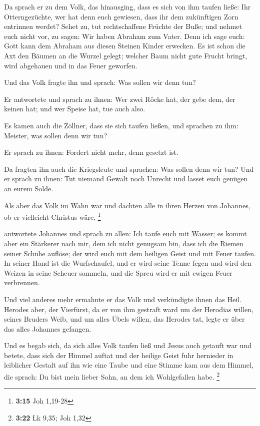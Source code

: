  Da sprach er zu dem Volk, das hinausging, dass es sich von
ihm taufen ließe: Ihr Otterngezüchte, wer hat denn euch gewiesen, dass
ihr dem zukünftigen Zorn entrinnen werdet?  Sehet zu, tut
rechtschaffene Früchte der Buße; und nehmet euch nicht vor, zu sagen:
Wir haben Abraham zum Vater. Denn ich sage euch: Gott kann dem Abraham
aus diesen Steinen Kinder erwecken.  Es ist schon die Axt
den Bäumen an die Wurzel gelegt; welcher Baum nicht gute Frucht bringt,
wird abgehauen und in das Feuer geworfen.

 Und das Volk fragte ihn und sprach: Was sollen wir denn
tun?

 Er antwortete und sprach zu ihnen: Wer zwei Röcke hat, der
gebe dem, der keinen hat; und wer Speise hat, tue auch also.

 Es kamen auch die Zöllner, dass sie sich taufen ließen,
und sprachen zu ihm: Meister, was sollen denn wir tun?

 Er sprach zu ihnen: Fordert nicht mehr, denn gesetzt ist.

 Da fragten ihn auch die Kriegsleute und sprachen: Was
sollen denn wir tun? Und er sprach zu ihnen: Tut niemand Gewalt noch
Unrecht und lasset euch genügen an eurem Solde.

 Als aber das Volk im Wahn war und dachten alle in ihren
Herzen von Johannes, ob er vielleicht Christus wäre, \footnote{\textbf{3:15}
  Joh 1,19-28}

 antwortete Johannes und sprach zu allen: Ich taufe euch
mit Wasser; es kommt aber ein Stärkerer nach mir, dem ich nicht genugsam
bin, dass ich die Riemen seiner Schuhe auflöse; der wird euch mit dem
heiligen Geist und mit Feuer taufen.  In seiner Hand ist
die Wurfschaufel, und er wird seine Tenne fegen und wird den Weizen in
seine Scheuer sammeln, und die Spreu wird er mit ewigen Feuer
verbrennen.

 Und viel anderes mehr ermahnte er das Volk und verkündigte
ihnen das Heil.  Herodes aber, der Vierfürst, da er von ihm
gestraft ward um der Herodias willen, seines Bruders Weib, und um alles
Übels willen, das Herodes tat,  legte er über das alles
Johannes gefangen.

 Und es begab sich, da sich alles Volk taufen ließ und
Jesus auch getauft war und betete, dass sich der Himmel auftat
 und der heilige Geist fuhr hernieder in leiblicher Gestalt
auf ihn wie eine Taube und eine Stimme kam aus dem Himmel, die sprach:
Du bist mein lieber Sohn, an dem ich Wohlgefallen habe. \footnote{\textbf{3:22}
  Lk 9,35; Joh 1,32}

